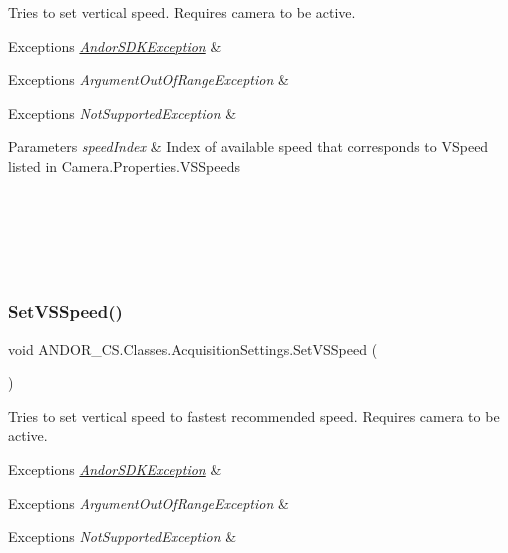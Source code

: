 Tries to set vertical speed. Requires camera to be active. 


\begin{DoxyExceptions}{Exceptions}
{\em \hyperlink{class_a_n_d_o_r___c_s_1_1_andor_s_d_k_exception}{Andor\+S\+D\+K\+Exception}} & 
\begin{DoxyExceptions}{Exceptions}
{\em Argument\+Out\+Of\+Range\+Exception} & 
\begin{DoxyExceptions}{Exceptions}
{\em Not\+Supported\+Exception} & 
\begin{DoxyParams}{Parameters}
{\em speed\+Index} & Index of available speed that corresponds to V\+Speed listed in Camera.\+Properties.V\+S\+Speeds\\
\hline
\end{DoxyParams}
\\
\hline
\end{DoxyExceptions}
\\
\hline
\end{DoxyExceptions}
\\
\hline
\end{DoxyExceptions}
\mbox{\label{class_a_n_d_o_r___c_s_1_1_classes_1_1_acquisition_settings_ab1ac4389f9428ff05583d991968fba40}} 
\subsubsection{\texorpdfstring{Set\+V\+S\+Speed()}{SetVSSpeed()}\hspace{0.1cm}{\footnotesize\ttfamily [2/2]}}
{\footnotesize\ttfamily void A\+N\+D\+O\+R\+\_\+\+C\+S.\+Classes.\+Acquisition\+Settings.\+Set\+V\+S\+Speed (\begin{DoxyParamCaption}{ }\end{DoxyParamCaption})}



Tries to set vertical speed to fastest recommended speed. Requires camera to be active. 


\begin{DoxyExceptions}{Exceptions}
{\em \hyperlink{class_a_n_d_o_r___c_s_1_1_andor_s_d_k_exception}{Andor\+S\+D\+K\+Exception}} & 
\begin{DoxyExceptions}{Exceptions}
{\em Argument\+Out\+Of\+Range\+Exception} & 
\begin{DoxyExceptions}{Exceptions}
{\em Not\+Supported\+Exception} & \\
\hline
\end{DoxyExceptions}
\\
\hline
\end{DoxyExceptions}
\\
\hline
\end{DoxyExceptions}


